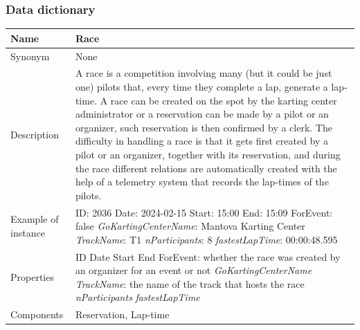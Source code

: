 \documentclass{beamer}
\begin{document}
\begin{frame}
\frametitle{Data dictionary}
\begin{table}
\tiny
\begin{tabular}{|p{2cm}|p{6cm}|}
\hline
Name & \textbf{Race} \\
\hline
Synonym & None \\
\hline
Description & A race is a competition involving many 
(but it could be just one) pilots that, every time they complete
a lap, generate a lap-time. A race can be created on the spot by
the karting center administrator or a reservation can be made by
a pilot or an organizer, such reservation is then confirmed by a clerk.
The difficulty in handling a race is that it gets first created by
a pilot or an organizer, together with its reservation, and 
during the race different relations are automatically created
with the help of a telemetry system that records the lap-times
of the pilots. \\
\hline
Example of instance &
ID: 2036 \newline
Date: 2024-02-15 \newline
Start: 15:00 \newline
End: 15:09 \newline
ForEvent: false \newline
\textit{GoKartingCenterName}: Mantova Karting Center \newline
\textit{TrackName}: T1 \newline
\textit{nParticipants}: 8 \newline
\textit{fastestLapTime}: 00:00:48.595 \\
\hline
Properties &
ID \newline
Date \newline
Start \newline
End \newline
ForEvent: whether the race was created by an organizer for an event or not \newline
\textit{GoKartingCenterName} \newline
\textit{TrackName}: the name of the track that hosts the race \newline
\textit{nParticipants} \newline
\textit{fastestLapTime} \\
\hline
Components & Reservation, Lap-time \\
\hline
\end{tabular}
\end{table}
\end{frame}
\end{document}
